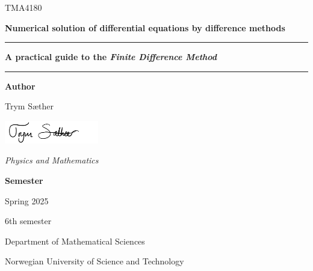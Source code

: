 \begin{titlepage}
    \newcommand{\HRule}{\rule{\linewidth}{0.5mm}}

    \center

    \vfill


    {\color{ntnu-blue}\sffamily\Large TMA4180 \par}
    {\sffamily\large\bfseries\color{black} Numerical solution of differential equations by difference methods}
    \vspace{0.5cm}
    {\color{ntnu-lightblue}\HRule}
    {\color{ntnu-blue}\sffamily\LARGE \textbf{A practical guide to the \textit{Finite Difference Method}}}
    {\color{ntnu-lightblue}\HRule}
    \vfill
    \begin{minipage}{0.60\textwidth}
        \begin{flushleft}
            \large
            {\color{ntnu-blue}\textbf{Author}}\par
            \vspace{0.15cm}
            Trym Sæther\par
            \vspace{0.2cm}
            \includegraphics[height=1cm]{frontmatter/TS_Signature.png}\par
            \vspace{0.2cm}
            {\color{ntnu-purple}\textit{Physics and Mathematics}}\par
        \end{flushleft}
    \end{minipage}
    \hfill
    \begin{minipage}{0.35\textwidth}
        \begin{flushright}
            \large
            {\color{ntnu-blue}\textbf{Semester}}\par
            \vspace{0.15cm}  %
            Spring 2025\par
            6th semester
        \end{flushright}
    \end{minipage}
    \vfill  %
    {\sffamily Department of Mathematical Sciences} \par
    {\color{ntnu-blue}\sffamily Norwegian University of Science and Technology}
\end{titlepage}
